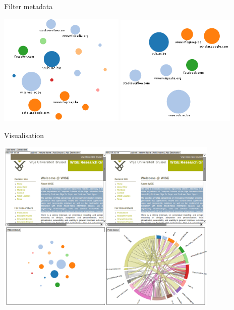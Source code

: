 \begin{frame}
	\begin{block}{Filter metadata}
		\begin{center}
			\includegraphics[width=0.45\textwidth]{./images/filter1.png}\hspace{0.1cm}
			\includegraphics[width=0.43\textwidth]{./images/filter2.png}
		\end{center}
	\end{block}
\end{frame}

\begin{frame}[t]
	\begin{block}{Visualisation}
		\begin{center}
			\includegraphics[width=0.8\textwidth]{./images/overview.png}
		\end{center}
	\end{block}
\end{frame}
